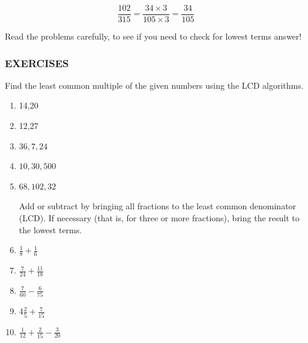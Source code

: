 \documentclass{ximera}
\begin{document}
$$\frac{102}{315}=\frac{34 \times 3}{105 \times 3}=\frac{34}{105}$$

Read the problems carefully, to see if you need to check for lowest terms answer!

\subsubsection*{EXERCISES}
Find the least common multiple of the given numbers using the LCD algorithms.

\begin{enumerate}
  \item 14,20
  \item 12,27
  \item $36,7,24$
  \item $10,30,500$
  \item $68,102,32$

  Add or subtract by bringing all fractions to the least common denominator (LCD). If necessary (that is, for three or more fractions), bring the result to the lowest terms.

  \item $\frac{1}{8}+\frac{1}{6}$
  \item $\frac{7}{24}+\frac{11}{18}$
  \item $\frac{7}{60}-\frac{6}{75}$
  \item $4 \frac{2}{5}+\frac{7}{15}$
  \item $\frac{1}{12}+\frac{2}{15}-\frac{3}{20}$
\end{enumerate}
\end{document}
